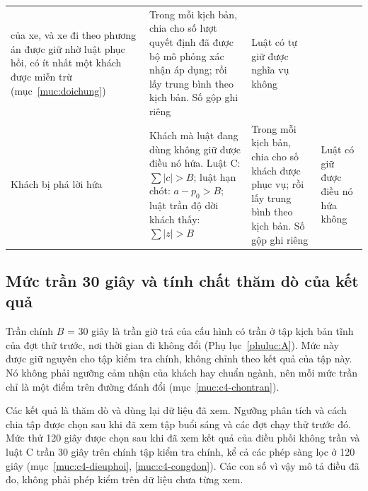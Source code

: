 \begin{table}[htbp]
\begin{tabular}{@{}p{2.7cm}p{5.3cm}p{3.5cm}p{3.5cm}@{}}
của xe, và xe đi theo phương án được giữ nhờ luật phục hồi, có ít nhất một khách được miễn trừ
(mục~\ref{muc:doichung}) & Trong mỗi kịch bản, chia cho số lượt quyết định đã được bộ mô phỏng xác nhận áp dụng;
rồi lấy trung bình theo kịch bản. Số gộp ghi riêng & Luật có tự giữ được nghĩa vụ không\\
Khách bị phá lời hứa & Khách mà luật đang dùng không giữ được điều nó hứa. Luật C: $\sum|c| > B$; luật hạn chót:
$a - p_0 > B$; luật trần độ dời khách thấy: $\sum|z| > B$ & Trong mỗi kịch bản, chia cho số khách được phục vụ;
rồi lấy trung bình theo kịch bản. Số gộp ghi riêng & Luật có giữ được điều nó hứa không\\
\bottomrule
\end{tabular}
\end{table}

\subsection{Mức trần 30 giây và tính chất thăm dò của kết quả}
\label{muc:c4-thamdo}

Trần chính $B$ = 30 giây là trần giờ trả của cấu hình có trần ở tập kịch bản tĩnh của đợt thử trước, nơi thời gian đi
không đổi (Phụ lục~\ref{phuluc:A}). Mức này được giữ nguyên cho tập kiểm tra chính, không chỉnh theo kết quả của tập
này. Nó không phải ngưỡng cảm nhận của khách hay chuẩn ngành, nên mỗi mức trần chỉ là một điểm trên đường đánh đổi
(mục~\ref{muc:c4-chontran}).

Các kết quả là thăm dò và dùng lại dữ liệu đã xem. Ngưỡng phân tích và cách chia tập được chọn sau khi đã xem tập buổi
sáng và các đợt chạy thử trước đó. Mức thử 120 giây được chọn sau khi đã xem kết quả của điều phối không trần và luật
C trần 30 giây trên chính tập kiểm tra chính, kể cả các phép sàng lọc ở 120 giây (mục~\ref{muc:c4-dieuphoi},
\ref{muc:c4-congdon}). Các con số vì vậy mô tả điều đã đo, không phải phép kiểm trên dữ liệu chưa từng xem.

